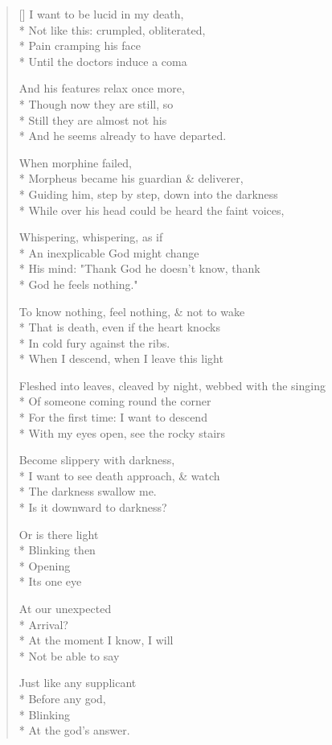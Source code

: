 \label{ch:deliverance}
\settowidth{\versewidth}{Fleshed into leaves, cleaved by night, webbed with the singing}
\begin{verse}[\versewidth]
I want to be lucid in my death,\\*
Not like this: crumpled, obliterated,\\*
Pain cramping his face\\*
Until the doctors induce a coma

And his features relax once more,\\*
Though now they are still, so\\*
Still they are almost not his\\*
And he seems already to have departed.

                                     When morphine failed,\\*
Morpheus became his guardian \& deliverer,\\*
Guiding him, step by step, down into the darkness\\*
While over his head could be heard the faint voices,

Whispering, whispering, as if\\*
An inexplicable God might change\\*
His mind: "Thank God he doesn't know, thank\\*
God he feels nothing."

To know nothing, feel nothing, \& not to wake\\*
That is death, even if the heart knocks\\*
In cold fury against the ribs.\\*
When I descend, when I leave this light

Fleshed into leaves, cleaved by night, webbed with the singing\\*
Of someone coming round the corner \\*
For the first time: I want to descend\\*
With my eyes open, see the rocky stairs

Become slippery with darkness,\\*
I want to see death approach, \& watch\\*
The darkness swallow me.\\*
Is it downward to darkness?

Or is there light\\*
Blinking then\\*
Opening\\*
Its one eye


At our unexpected\\*
Arrival?\\*
At the moment I know, I will\\*
Not be able to say

Just like any supplicant\\*
Before any god,\\*
Blinking\\*
At the god's answer.
\end{verse}
